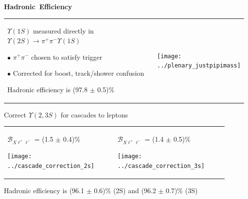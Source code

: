 \documentclass[landscape]{article}
\newenvironment{slide}[1][ ]{\mbox{\bf #1 } \vfill}{\vfill \mbox{ } \pagebreak}
\begin{document}
\begin{slide}[Hadronic Efficiency]

  \vspace{-1.5 cm}
  \begin{center}
    \begin{tabular}{p{0.63\linewidth} p{0.35\linewidth}}
      \begin{minipage}{\linewidth}
	$\Upsilon(1S)$ measured directly in $\Upsilon(2S) \to \pi^+\pi^- \Upsilon(1S)$

	\vspace{0.5 cm}
	\mbox{\hspace{0.25 cm}} {\large $\bullet$} $\pi^+\pi^-$ chosen to satisfy trigger

	\vspace{0.5 cm}
	\mbox{\hspace{0.25 cm}} {\large $\bullet$} Corrected for boost, track/shower confusion

	\vspace{0.5 cm}
	Hadronic efficiency is (97.8 $\pm$ 0.5)\%
      \end{minipage} &
      \begin{minipage}{\linewidth}
	\texttt{[image: ../plenary\_justpipimass]}
      \end{minipage}
    \end{tabular}
  \end{center}

  Correct $\Upsilon(2,3S)$ for cascades to leptons

  \vspace{0.1 cm}
  \begin{center}
    \begin{tabular}{p{0.45\linewidth} p{0.45\linewidth}}
      \begin{minipage}{\linewidth}
	\begin{center}
	  $\mathcal{B}_{X\ell^+\ell^-}$ = (1.5 $\pm$ 0.4)\%

	  \vspace{0.1 cm}
	  \texttt{[image: ../cascade\_correction\_2s]}
	\end{center}
      \end{minipage} &
      \begin{minipage}{\linewidth}
	\begin{center}
	  $\mathcal{B}_{X\ell^+\ell^-}$ = (1.4 $\pm$ 0.5)\% 

	  \vspace{0.1 cm}
	  \texttt{[image: ../cascade\_correction\_3s]}
	\end{center}
      \end{minipage}
    \end{tabular}
  \end{center}

  \vspace{0.1 cm}
  Hadronic efficiency is (96.1 $\pm$ 0.6)\% (2S) and (96.2 $\pm$ 0.7)\% (3S)
\end{slide}
\end{document}
